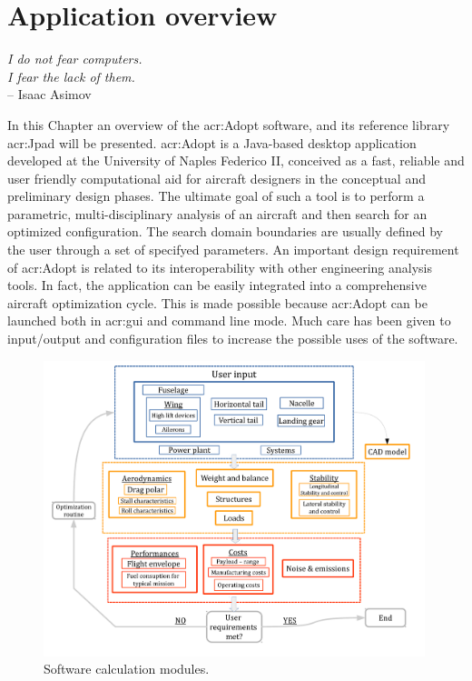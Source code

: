\chapter{Application overview}
\label{ch:applicationoverview}

\begin{flushright}
	{\smaller
		\textit{I do not fear computers. \\ I fear the lack of them.}\\
		--  Isaac Asimov}
\end{flushright}
In this Chapter an overview of the \gls{acr:Adopt} software, and its reference library \gls{acr:Jpad} will be presented.
\gls{acr:Adopt} is a Java-based desktop application developed at the University of Naples Federico II, conceived as a fast, reliable and user friendly computational aid for aircraft designers in the conceptual and preliminary design phases. The ultimate goal of such a tool is to perform a parametric, multi-disciplinary analysis of an aircraft and then search for an optimized configuration. The search domain boundaries are usually defined by the user through a set of specifyed parameters. An important design requirement of  \gls{acr:Adopt} is related to its interoperability with other engineering analysis tools. In fact, the application can be easily integrated into a comprehensive aircraft optimization cycle. This is made possible because  \gls{acr:Adopt} can be launched both in \gls{acr:gui} and command line mode. Much care has been given to input/output and configuration files to increase the possible uses of the software.

\begin{figure}[H]
	\centering
	\includegraphics[height = 8.6cm ]{Immagini/flowchart3}
	\caption{Software calculation modules.}
	\label{fig:guiStart}
\end{figure}

